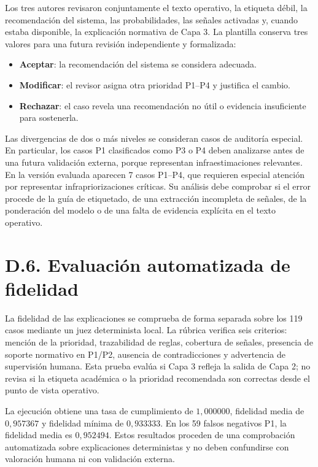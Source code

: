 Los tres autores revisaron conjuntamente el texto operativo, la etiqueta débil, la
recomendación del sistema, las probabilidades, las señales activadas y, cuando estaba
disponible, la explicación normativa de Capa 3. La plantilla conserva tres valores para
una futura revisión independiente y formalizada:

\begin{itemize}
    \item \textbf{Aceptar}: la recomendación del sistema se considera adecuada.
    \item \textbf{Modificar}: el revisor asigna otra prioridad P1--P4 y justifica el
    cambio.
    \item \textbf{Rechazar}: el caso revela una recomendación no útil o evidencia
    insuficiente para sostenerla.
\end{itemize}

Las divergencias de dos o más niveles se consideran casos de auditoría especial. En particular,
los casos P1 clasificados como P3 o P4 deben analizarse antes de una futura validación externa,
porque representan infraestimaciones relevantes. En la versión evaluada aparecen 7
casos P1--P4, que requieren especial atención por representar infrapriorizaciones
críticas. Su análisis debe comprobar si el error procede de la guía de etiquetado, de
una extracción incompleta de señales, de la ponderación del modelo o de una falta de
evidencia explícita en el texto operativo.

\section*{D.6. Evaluación automatizada de fidelidad}

La fidelidad de las explicaciones se comprueba de forma separada sobre los 119 casos
mediante un juez determinista local. La rúbrica verifica seis criterios: mención de la
prioridad, trazabilidad de reglas, cobertura de señales, presencia de soporte normativo
en P1/P2, ausencia de contradicciones y advertencia de supervisión humana. Esta prueba
evalúa si Capa 3 refleja la salida de Capa 2; no revisa si la etiqueta académica o la
prioridad recomendada son correctas desde el punto de vista operativo.

La ejecución obtiene una tasa de cumplimiento de \(1{,}000000\), fidelidad media de
\(0{,}957367\) y fidelidad mínima de \(0{,}933333\). En los 59 falsos negativos P1,
la fidelidad media es \(0{,}952494\). Estos resultados proceden de una comprobación
automatizada sobre explicaciones deterministas y no deben confundirse con valoración
humana ni con validación externa.

